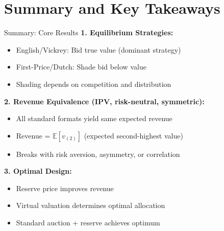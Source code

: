 \documentclass[xcolor={x11names}]{beamer}
\newcommand{\E}{\mathbb{E}}
\begin{document}
\section{Summary and Key Takeaways}

\begin{frame}{Summary: Core Results}
\textbf{1. Equilibrium Strategies:}
\begin{itemize}
  \item English/Vickrey: Bid true value (dominant strategy)
  \item First-Price/Dutch: Shade bid below value
  \item Shading depends on competition and distribution
\end{itemize}

\textbf{2. Revenue Equivalence (IPV, risk-neutral, symmetric):}
\begin{itemize}
  \item All standard formats yield same expected revenue
  \item Revenue = $\E[v_{(2)}]$ (expected second-highest value)
  \item Breaks with risk aversion, asymmetry, or correlation
\end{itemize}

\textbf{3. Optimal Design:}
\begin{itemize}
  \item Reserve price improves revenue
  \item Virtual valuation determines optimal allocation
  \item Standard auction + reserve achieves optimum
\end{itemize}
\end{frame}
\end{document}
